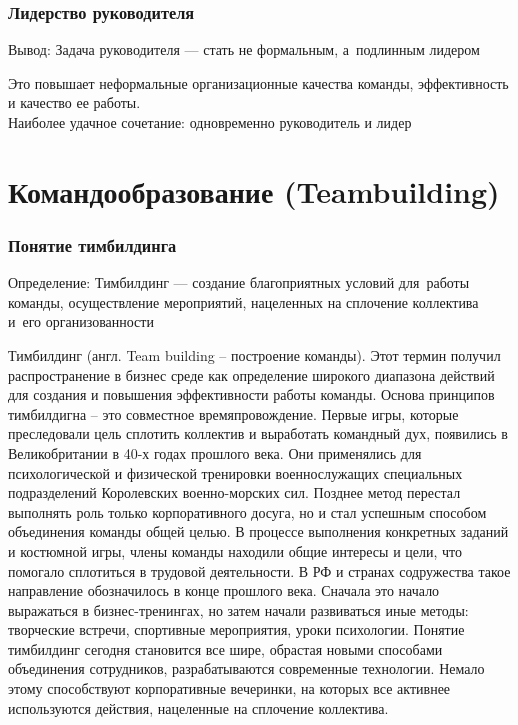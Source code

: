 \documentclass{../industrial-development}
\begin{document}
\begin{frame} \frametitle {Лидерство руководителя}

\begin{block}{Вывод:}
Задача руководителя --- стать не формальным, а~подлинным лидером \end{block}
Это повышает неформальные организационные качества команды, эффективность и качество ее работы.\\
\vspace{5pt} \alert{Наиболее удачное сочетание:} одновременно руководитель и лидер
\end{frame}




\section{Командообразование (Teambuilding)}

\begin{frame} \frametitle{Понятие тимбилдинга}
\begin{block}{Определение:}
Тимбилдинг --- создание благоприятных условий для~работы команды, осуществление мероприятий, нацеленных на сплочение коллектива и~его организованности
\end{block}
\end{frame}

\lecturenotes Тимбилдинг (англ. Team building – построение команды). Этот термин получил распространение в бизнес среде как определение широкого диапазона действий для создания и повышения эффективности работы команды. Основа принципов тимбилдигна – это совместное времяпровождение. 
Первые игры, которые преследовали цель сплотить коллектив и выработать командный дух, появились в Великобритании в 40-х годах прошлого века. Они применялись для психологической и физической тренировки военнослужащих специальных подразделений Королевских военно-морских сил. 
Позднее метод перестал выполнять роль только корпоративного досуга, но и стал успешным способом объединения команды общей целью. В процессе выполнения конкретных заданий и костюмной игры, члены команды находили общие интересы и цели, что помогало сплотиться в трудовой деятельности. В РФ и странах содружества такое направление обозначилось в конце прошлого века.
Сначала это начало выражаться в бизнес-тренингах, но затем начали развиваться иные методы: творческие встречи, спортивные мероприятия, уроки психологии. Понятие тимбилдинг сегодня становится все шире, обрастая новыми способами объединения сотрудников, разрабатываются современные технологии.
Немало этому способствуют корпоративные вечеринки, на которых все активнее используются действия, нацеленные на сплочение коллектива.
\end{document}
